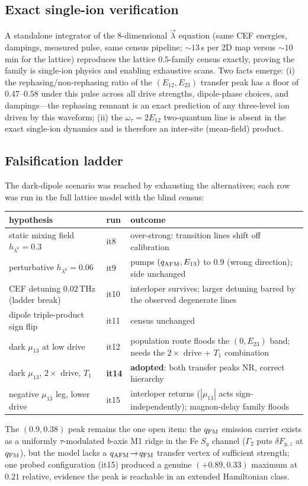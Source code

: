 \documentclass[11pt]{article}
\newcommand{\qafm}{q_{\rm AFM}}
\newcommand{\qfm}{q_{\rm FM}}
\begin{document}
\subsection{Exact single-ion verification}
A standalone integrator of the 8-dimensional $\vec\lambda$ equation
(same CEF energies, dampings, measured pulse, same census pipeline;
$\sim13$\,s per 2D map versus $\sim10$\,min for the lattice) reproduces
the lattice $0.5$-family census exactly, proving the family is
single-ion physics and enabling exhaustive scans.  Two facts emerge:
(i) the rephasing/non-rephasing ratio of the $(E_{12},E_{23})$ transfer
peak has a floor of $0.47$--$0.58$ under this pulse across all drive
strengths, dipole-phase choices, and dampings---the rephasing remnant is
an exact prediction of any three-level ion driven by this waveform;
(ii) the $\omega_\tau=2E_{12}$ two-quantum line is absent in the exact
single-ion dynamics and is therefore an inter-site (mean-field) product.

\subsection{Falsification ladder}
The dark-dipole scenario was reached by exhausting the alternatives;
each row was run in the full lattice model with the blind census:
\begin{center}\small
\renewcommand{\arraystretch}{1.25}
\begin{tabular}{p{4.6cm}p{1.1cm}p{7.4cm}}
\toprule
hypothesis & run & outcome\\
\midrule
static mixing field $h_{\lambda^6}=0.3$ & it8 &
  over-strong: transition lines shift off calibration\\
perturbative $h_{\lambda^6}=0.06$ & it9 &
  pumps $(\qafm,E_{13})$ to $0.9$ (wrong direction); side unchanged\\
CEF detuning $0.02$\,THz (ladder break) & it10 &
  interloper survives; larger detuning barred by the observed
  degenerate lines\\
dipole triple-product sign flip & it11 & census unchanged\\
dark $\mu_{13}$ at low drive & it12 &
  population route floods the $(0,E_{23})$ band; needs the
  $2\times$ drive + $T_1$ combination\\
dark $\mu_{13}$, $2\times$ drive, $T_1$ & \textbf{it14} &
  \textbf{adopted}: both transfer peaks NR, correct hierarchy\\
negative $\mu_{13}$ leg, lower drive & it15 &
  interloper returns ($|\mu_{13}|$ acts sign-independently);
  magnon-delay family floods\\
\bottomrule
\end{tabular}
\end{center}
The $(0.9,0.38)$ peak remains the one open item: the $\qfm$ emission
carrier exists as a uniformly $\tau$-modulated $b$-axis M1 ridge in the
Fe $S_y$ channel ($\Gamma_2$ puts $\delta F_{y,z}$ at $\qfm$), but the
model lacks a $\qafm\!\to\!\qfm$ transfer vertex of sufficient
strength; one probed configuration (it15) produced a genuine
$(+0.89,0.33)$ maximum at $0.21$ relative, evidence the peak is
reachable in an extended Hamiltonian class.
\end{document}
